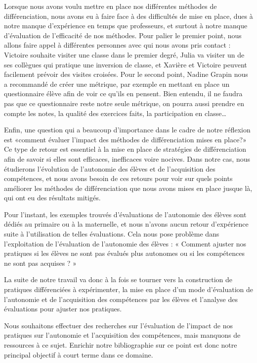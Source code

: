 Lorsque nous avons voulu mettre en place nos différentes méthodes de différenciation, nous avons eu à faire face à des difficultés de mise en place, dues à notre manque d’expérience en temps que professeurs, et surtout à notre manque d’évaluation de l’efficacité de nos méthodes. Pour palier le premier point, nous allons faire appel à différentes personnes avec qui nous avons pris contact : Victoire souhaite visiter une classe dans le premier degré, Julia va visiter un de ses collègues qui pratique une inversion de classe, et Xavière et Victoire peuvent facilement prévoir des visites croisées. Pour le second point, Nadine Grapin nous a recommandé de créer une métrique, par exemple en mettant en place un questionnaire élève afin de voir ce qu’ils en pensent. Bien entendu, il ne faudra pas que ce questionnaire reste notre seule métrique, on pourra aussi prendre en compte les notes, la qualité des exercices faits, la participation en classe…

Enfin, une question qui a beaucoup d’importance dans le cadre de notre réflexion est «comment évaluer l’impact des méthodes de différenciation mises en place?» Ce type de retour est essentiel à la mise en place de stratégies de différenciation afin de savoir si elles sont efficaces, inefficaces voire nocives. Dans notre cas, nous étudierons l’évolution de l’autonomie des élèves et de l’acquisition des compétences, et nous avons besoin de ces retours pour voir sur quels points améliorer les méthodes de différenciation que nous avons mises en place jusque là, qui ont eu des résultats mitigés. 

Pour l’instant, les exemples trouvés d’évaluations de l’autonomie des élèves sont dédiés au primaire ou à la maternelle, et nous n’avons aucun retour d’expérience suite à l’utilisation de telles évaluations. Cela nous pose problème dans l’exploitation de l’évaluation de l’autonomie des élèves : « Comment ajuster nos pratiques si les élèves ne sont pas évalués plus autonomes ou si les compétences ne sont pas acquises ? »

La suite de notre travail va donc à la fois se tourner vers la construction de pratiques différenciées à expérimenter, la mise en place d’un mode d’évaluation de l’autonomie et de l’acquisition des compétences par les élèves et l’analyse des évaluations pour ajuster nos pratiques.

Nous souhaitons effectuer des recherches sur l’évaluation de l’impact de nos pratiques sur l’autonomie et l’acquisition des compétences, mais manquons de ressources à ce sujet. Enrichir notre bibliographie sur ce point est donc notre principal objectif à court terme dans ce domaine.